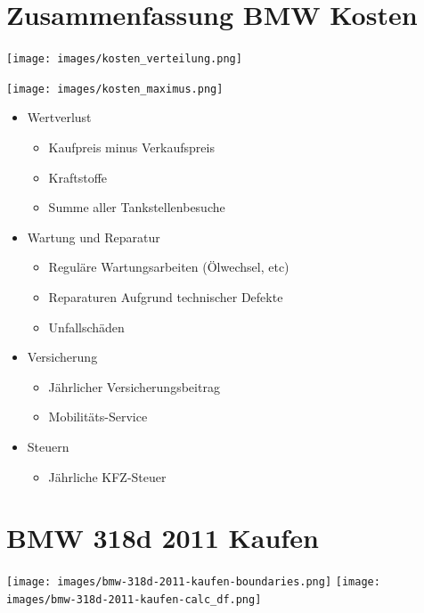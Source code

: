 \documentclass[landscape, DIV=99, 14pt]{scrartcl}
\begin{document}
\twocolumn
\section*{Zusammenfassung BMW Kosten}
\null
\vspace{1cm}
\begin{center}
\texttt{[image: images/kosten\_verteilung.png]}
\end{center}

\texttt{[image: images/kosten\_maximus.png]}

\pagebreak

\begin{itemize}
    \item Wertverlust
    \begin{itemize}
        \item Kaufpreis minus Verkaufspreis
        \item Kraftstoffe
        \item Summe aller Tankstellenbesuche
    \end{itemize}
    \item Wartung und Reparatur
    \begin{itemize}
        \item Regul\"are Wartungsarbeiten (\"Olwechsel, etc)
        \item Reparaturen Aufgrund technischer Defekte
        \item Unfallsch\"aden
    \end{itemize}
    \item Versicherung
    \begin{itemize}
        \item J\"ahrlicher Versicherungsbeitrag
        \item Mobilit\"ats-Service
    \end{itemize}
    \item Steuern
    \begin{itemize}
            \item J\"ahrliche KFZ-Steuer
    \end{itemize}
\end{itemize}


\twocolumn

\section*{BMW 318d 2011 Kaufen}
\begin{center}
\texttt{[image: images/bmw-318d-2011-kaufen-boundaries.png]}
\null
\vspace{0.5cm}
\texttt{[image: images/bmw-318d-2011-kaufen-calc\_df.png]}
\end{center}
\end{document}
